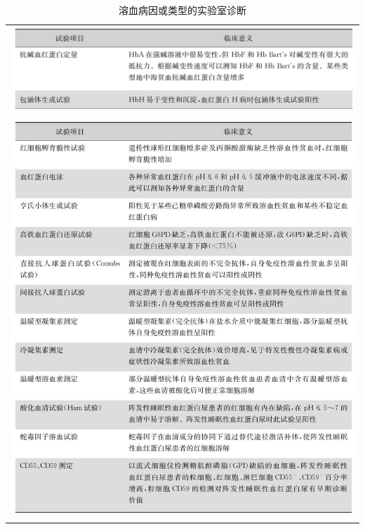 \begin{longtable}{c}
 \caption{溶血病因或类型的实验室诊断}
 \label{tab33-5}
 \endfirsthead
 \caption[]{溶血病因或类型的实验室诊断}
 \endhead
 \includegraphics[width=\textwidth,height=\textheight,keepaspectratio]{./images/Image00167.jpg}\\
 \includegraphics[width=\textwidth,height=\textheight,keepaspectratio]{./images/Image00168.jpg}
 \end{longtable}


